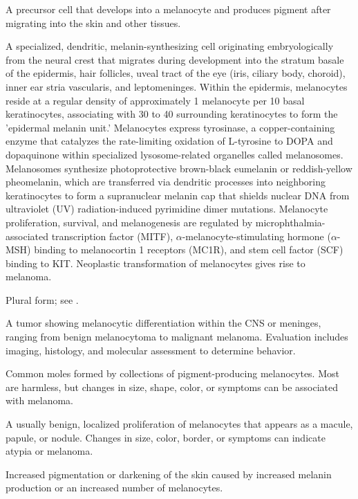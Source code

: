  A precursor cell that develops into a melanocyte and produces pigment after migrating into the skin and other tissues.

 A specialized, dendritic, melanin-synthesizing cell originating embryologically from the neural crest that migrates during development into the stratum basale of the epidermis, hair follicles, uveal tract of the eye (iris, ciliary body, choroid), inner ear stria vascularis, and leptomeninges. Within the epidermis, melanocytes reside at a regular density of approximately 1 melanocyte per 10 basal keratinocytes, associating with 30 to 40 surrounding keratinocytes to form the 'epidermal melanin unit.' Melanocytes express tyrosinase, a copper-containing enzyme that catalyzes the rate-limiting oxidation of L-tyrosine to DOPA and dopaquinone within specialized lysosome-related organelles called melanosomes. Melanosomes synthesize photoprotective brown-black eumelanin or reddish-yellow pheomelanin, which are transferred via dendritic processes into neighboring keratinocytes to form a supranuclear melanin cap that shields nuclear DNA from ultraviolet (UV) radiation-induced pyrimidine dimer mutations. Melanocyte proliferation, survival, and melanogenesis are regulated by microphthalmia-associated transcription factor (MITF), $\alpha$-melanocyte-stimulating hormone ($\alpha$-MSH) binding to melanocortin 1 receptors (MC1R), and stem cell factor (SCF) binding to KIT. Neoplastic transformation of melanocytes gives rise to melanoma.

 Plural form; see .

 A tumor showing melanocytic differentiation within the CNS or meninges, ranging from benign melanocytoma to malignant melanoma. Evaluation includes imaging, histology, and molecular assessment to determine behavior.

 Common moles formed by collections of pigment-producing melanocytes. Most are harmless, but changes in size, shape, color, or symptoms can be associated with melanoma.

 A usually benign, localized proliferation of melanocytes that appears as a macule, papule, or nodule. Changes in size, color, border, or symptoms can indicate atypia or melanoma.

 Increased pigmentation or darkening of the skin caused by increased melanin production or an increased number of melanocytes.

